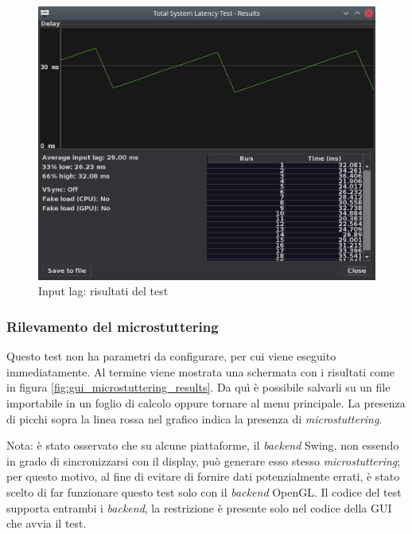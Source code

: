 \begin{figure}[H]
	\centering
	\includegraphics[width=\textwidth]{Applicazione_files/gui_inputlag_results.png}
	\caption{Input lag: risultati del test}
	\label{fig:gui_inputlag_results}
\end{figure}

\subsubsection{Rilevamento del microstuttering}
Questo test non ha parametri da configurare, per cui viene eseguito immediatamente. Al termine viene mostrata una schermata con i risultati come in figura \ref{fig:gui_microstuttering_results}. Da quì è possibile salvarli su un file importabile in un foglio di calcolo oppure tornare al menu principale. La presenza di picchi sopra la linea rossa nel grafico indica la presenza di \textit{microstuttering}.

Nota: è stato osservato che su alcune piattaforme, il \textit{backend} Swing, non essendo in grado di sincronizzarsi con il display, può generare esso stesso \textit{microstuttering}; per questo motivo, al fine di evitare di fornire dati potenzialmente errati, è stato scelto di far funzionare questo test solo con il \textit{backend} OpenGL. Il codice del test supporta entrambi i \textit{backend}, la restrizione è presente solo nel codice della GUI che avvia il test.

